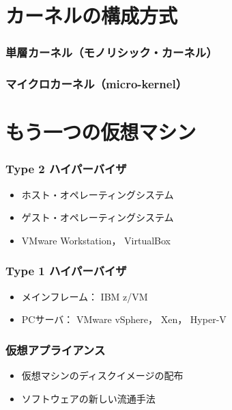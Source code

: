 \documentclass[handout]{beamer}                   %
\begin{document}
\section{カーネルの構成方式}
\begin{frame}
  \frametitle{単層カーネル（モノリシック・カーネル）}
\end{frame}

\begin{frame}
  \frametitle{マイクロカーネル（micro-kernel）}
\end{frame}

\section{もう一つの仮想マシン}
\begin{frame}
  \frametitle{Type 2 ハイパーバイザ}
  \begin{itemize}
  \item ホスト・オペレーティングシステム
  \item ゲスト・オペレーティングシステム
  \item VMware Workstation， VirtualBox
  \end{itemize}
\end{frame}

\begin{frame}
  \frametitle{Type 1 ハイパーバイザ}
  \begin{itemize}
  \item メインフレーム： IBM z/VM
  \item PCサーバ： VMware vSphere， Xen， Hyper-V
  \end{itemize}
\end{frame}

\begin{frame}
  \frametitle{仮想アプライアンス}
  \begin{itemize}
  \item 仮想マシンのディスクイメージの配布
  \item ソフトウェアの新しい流通手法
  \end{itemize}
\end{frame}
\end{document}
